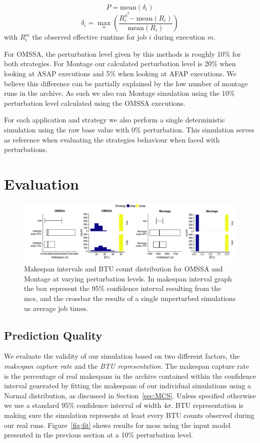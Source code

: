 \documentclass[10pt,conference,compsocconf]{IEEEtran}
\begin{document}
\[P = \underset{i}{\textrm{mean}}(\delta{}_i)\]
\[\delta{}_i = \max_n\left(\frac{R_i^n-\textrm{mean}(R_i)}{\textrm{mean}(R_i)}\right)\]
with $R_i^m$ the observed effective runtime for job $i$ during execution $m$. 

For OMSSA, the perturbation level given by this methods is roughly 10\% for both
strategies. For Montage  our calculated perturbation level is  20\% when looking
at ASAP  executions and  5\% when  looking at AFAP  executions. We  believe this
difference can be partially  explained by the low number of  montage runs in the
archive. As  such we  also ran  Montage simulation  using the  10\% perturbation
level calculated using the OMSSA executions.

For  each  application and  strategy  we  also  perform a  single  deterministic
simulation  using the  raw base  value  with 0\%  perturbation. This  simulation
serves as  reference when  evaluating the strategies  behaviour when  faced with
perturbations.

\section{Evaluation}
\label{sec:eval}

\begin{figure}
	\includegraphics[width=\textwidth]{gfx/int_plot.pdf}
	\caption{Makespan intervals and BTU count distribution for OMSSA and 
	Montage at varying perturbation levels.	In makespan interval graph the 
	box represent the 95\% confidence interval resulting from the \acs{mcs},
	and the crossbar the results of a single unperturbed simulations us 
	average job times.}\label{fig:int}
\end{figure}

\subsection{Prediction Quality}

We evaluate the  validity of our simulation based on  two different factors, the
\emph{makespan  capture rate}  and the  \emph{BTU representation}.  The makespan
capture rate is the percentage of  real makespans in the archive contained within
the confidence  interval generated  by fitting the  makespans of  our individual
simulations    using     a    Normal     distribution,    as     discussed    in
Section~\ref{sec:MCS}.  Unless  specified  otherwise  we  use  a  standard  95\%
confidence interval  of width $4\sigma$.  BTU representation is making  sure the
simulation  represents  at least  every  BTU  counts  observed during  our  real
runs. Figure~\ref{fig:fit}  shows results  for \acp{mcs}  using the  input model
presented in the previous section at a 10\% perturbation level.
\end{document}
